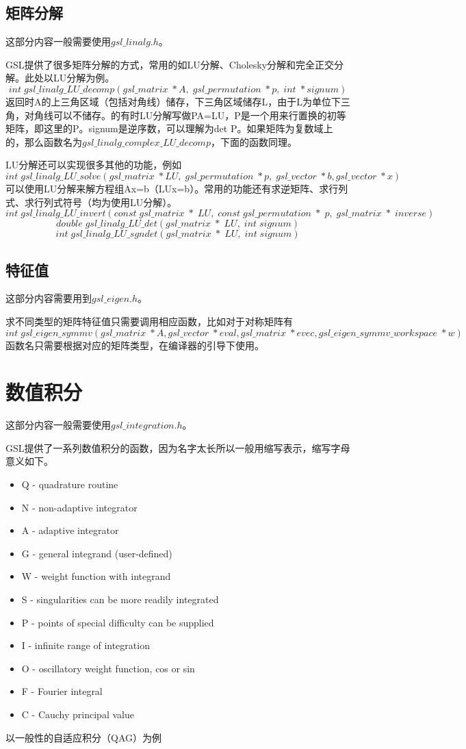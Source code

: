 \documentclass[a4paper,11pt,onecolumn,twoside]{article}
\begin{document}
\subsection{矩阵分解}
这部分内容一般需要使用$gsl\_linalg.h$。\par
GSL提供了很多矩阵分解的方式，常用的如LU分解、Cholesky分解和完全正交分解。此处以LU分解为例。
$$
int\;gsl\_linalg\_LU\_decomp(gsl\_matrix\;* A,\; gsl\_permutation\; * p,\;int \;* signum)
$$
返回时A的上三角区域（包括对角线）储存，下三角区域储存L，由于L为单位下三角，对角线可以不储存。的有时LU分解写做PA=LU，P是一个用来行置换的初等矩阵，即这里的P。signum是逆序数，可以理解为det P。如果矩阵为复数域上的，那么函数名为$gsl\_linalg\_complex\_LU\_decomp$，下面的函数同理。\par
LU分解还可以实现很多其他的功能，例如
$$
int\;gsl\_linalg\_LU\_solve(gsl\_matrix\;* LU, \;gsl\_permutation \;* p,\;gsl\_vector \;* b, gsl\_vector \;* x)
$$
可以使用LU分解来解方程组Ax=b（LUx=b）。常用的功能还有求逆矩阵、求行列式、求行列式符号（均为使用LU分解）。
$$
int\;gsl\_linalg\_LU\_invert(const\;gsl\_matrix\;*\;LU,\;const\;gsl\_permutation\;*\;p,\;gsl\_matrix\;*\;inverse)
$$
$$
double\;gsl\_linalg\_LU\_det(gsl\_matrix\;*\;LU,\;int\;signum)
$$
$$
int\;gsl\_linalg\_LU\_sgndet(gsl\_matrix\;*\;LU,\;int\;signum)
$$
\subsection{特征值}
这部分内容需要用到$gsl\_eigen.h$。\par
求不同类型的矩阵特征值只需要调用相应函数，比如对于对称矩阵有
$$
int\;gsl\_eigen\_symmv(gsl\_matrix\; * A, gsl\_vector \;* eval, gsl\_matrix \;* evec, gsl\_eigen\_symmv\_workspace\; * w)
$$
函数名只需要根据对应的矩阵类型，在编译器的引导下使用。
\section{数值积分}
这部分内容一般需要使用$gsl\_integration.h$。\par
GSL提供了一系列数值积分的函数，因为名字太长所以一般用缩写表示，缩写字母意义如下。
\begin{itemize}
\item Q - quadrature routine 
\item N - non-adaptive integrator
\item A - adaptive integrator
\item G - general integrand (user-defined) 
\item W - weight function with integrand
\item S - singularities can be more readily integrated
\item P - points of special difficulty can be supplied
\item I - infinite range of integration
\item O - oscillatory weight function, cos or sin
\item F - Fourier integral
\item C - Cauchy principal value
\end{itemize}
以一般性的自适应积分（QAG）为例
\end{document}
